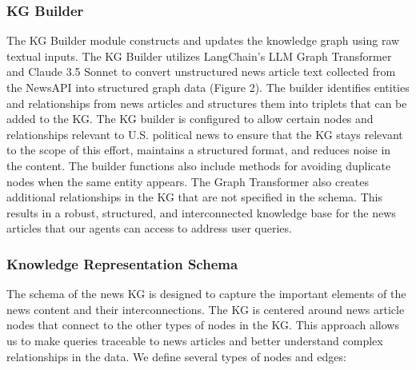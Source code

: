 \documentclass{scrartcl}
\begin{document}
\subsubsection{KG Builder}

The KG Builder module constructs and updates the knowledge graph using raw textual inputs. The KG Builder utilizes LangChain’s LLM Graph Transformer and Claude 3.5 Sonnet to convert unstructured news article text collected from the NewsAPI into structured graph data (Figure 2). The builder identifies entities and relationships from news articles and structures them into triplets that can be added to the KG.
The KG builder is configured to allow certain nodes and relationships relevant to U.S. political news to ensure that the KG stays relevant to the scope of this effort, maintains a structured format, and reduces noise in the content. The builder functions also include methods for avoiding duplicate nodes when the same entity appears. The Graph Transformer also creates additional relationships in the KG that are not specified in the schema. This results in a robust, structured, and interconnected knowledge base for the news articles that our agents can access to address user queries.

\subsubsection{Knowledge Representation Schema}

The schema of the news KG is designed to capture the important elements of the news content and their interconnections. The KG is centered around news article nodes that connect to the other types of nodes in the KG. This approach allows us to make queries traceable to news articles and better understand complex relationships in the data. We define several types of nodes and edges:
\end{document}
